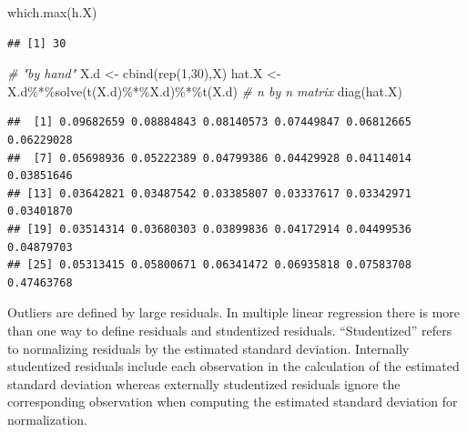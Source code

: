 \documentclass[
]{book}
\newenvironment{Shaded}{\begin{snugshade}}{\end{snugshade}}
\newcommand{\CommentTok}[1]{\textcolor[rgb]{0.56,0.35,0.01}{\textit{#1}}}
\newcommand{\DecValTok}[1]{\textcolor[rgb]{0.00,0.00,0.81}{#1}}
\newcommand{\FunctionTok}[1]{\textcolor[rgb]{0.00,0.00,0.00}{#1}}
\newcommand{\NormalTok}[1]{#1}
\newcommand{\OtherTok}[1]{\textcolor[rgb]{0.56,0.35,0.01}{#1}}
\newcommand{\SpecialCharTok}[1]{\textcolor[rgb]{0.00,0.00,0.00}{#1}}
\begin{document}
\begin{Shaded}
\begin{Highlighting}[]
\FunctionTok{which.max}\NormalTok{(h.X)}
\end{Highlighting}
\end{Shaded}

\begin{verbatim}
## [1] 30
\end{verbatim}

\begin{Shaded}
\begin{Highlighting}[]
\CommentTok{\# "by hand"}
\NormalTok{X.d }\OtherTok{\textless{}{-}} \FunctionTok{cbind}\NormalTok{(}\FunctionTok{rep}\NormalTok{(}\DecValTok{1}\NormalTok{,}\DecValTok{30}\NormalTok{),X)}
\NormalTok{hat.X }\OtherTok{\textless{}{-}}\NormalTok{ X.d}\SpecialCharTok{\%*\%}\FunctionTok{solve}\NormalTok{(}\FunctionTok{t}\NormalTok{(X.d)}\SpecialCharTok{\%*\%}\NormalTok{X.d)}\SpecialCharTok{\%*\%}\FunctionTok{t}\NormalTok{(X.d)  }\CommentTok{\# n by n matrix}
\FunctionTok{diag}\NormalTok{(hat.X)}
\end{Highlighting}
\end{Shaded}

\begin{verbatim}
##  [1] 0.09682659 0.08884843 0.08140573 0.07449847 0.06812665 0.06229028
##  [7] 0.05698936 0.05222389 0.04799386 0.04429928 0.04114014 0.03851646
## [13] 0.03642821 0.03487542 0.03385807 0.03337617 0.03342971 0.03401870
## [19] 0.03514314 0.03680303 0.03899836 0.04172914 0.04499536 0.04879703
## [25] 0.05313415 0.05800671 0.06341472 0.06935818 0.07583708 0.47463768
\end{verbatim}

Outliers are defined by large residuals. In multiple linear regression there is more than one way to define residuals and studentized residuals. ``Studentized'' refers to normalizing residuals by the estimated standard deviation. Internally studentized residuals include each observation in the calculation of the estimated standard deviation whereas externally studentized residuals ignore the corresponding observation when computing the estimated standard deviation for normalization.

\begin{Shaded}
\end{Shaded}
\end{document}
